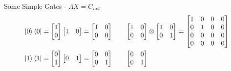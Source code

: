 \documentclass{beamer}
\begin{document}
\begin{frame}{Some Simple Gates - $\Lambda X = C_{not}$}
  {\tiny
    \begin{align*}
      \ket0\bra0 &=
      \begin{bmatrix}
        1 \\
        0 \\
      \end{bmatrix}
      \begin{bmatrix}
        1 & 0
      \end{bmatrix}
      =
      \begin{bmatrix}
        1 & 0 \\
        0 & 0 \\
      \end{bmatrix}
      \qquad
      \begin{bmatrix}
        1 & 0 \\
        0 & 0 \\
      \end{bmatrix}
      \otimes
      \begin{bmatrix}
        1 & 0 \\
        0 & 1 \\
      \end{bmatrix}
      =
      \begin{bmatrix}
        1 & 0 & 0 & 0 \\
        0 & 1 & 0 & 0 \\
        0 & 0 & 0 & 0 \\
        0 & 0 & 0 & 0 \\
      \end{bmatrix}
      \\
      \ket1\bra1 &=
      \begin{bmatrix}
        0 \\
        1 \\
      \end{bmatrix}
      \begin{bmatrix}
        0 & 1
      \end{bmatrix}
      =
      \begin{bmatrix}
        0 & 0 \\
        0 & 1 \\
      \end{bmatrix}
      \qquad
      \begin{bmatrix}
        0 & 0 \\
        0 & {\color{red}1} \\
      \end{bmatrix}

\end{align*}}
\end{frame}
\end{document}
